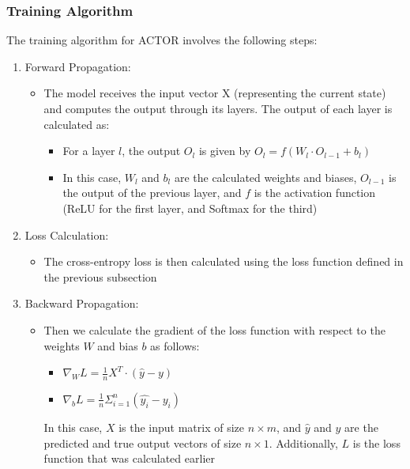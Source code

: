 \documentclass[11pt]{article}
\begin{document}
\subsubsection{Training Algorithm}

The training algorithm for ACTOR involves the following steps:

\begin{enumerate}
    \item Forward Propagation:
    \begin{itemize}
        \item The model receives the input vector X (representing the current state) and computes the output through its layers. The output of each layer is calculated as:
        \begin{itemize}
            \item For a layer $l$, the output $O_l$ is given by $O_l = f(W_l \cdot O_{l - 1} + b_l)$
            \item In this case, $W_l$ and $b_l$ are the calculated weights and biases, $O_{l - 1}$ is the output of the previous layer, and $f$ is the activation function (ReLU for the first layer, and Softmax for the third)
        \end{itemize}
    \end{itemize}
    \item Loss Calculation:
    \begin{itemize}
        \item The cross-entropy loss is then calculated using the loss function defined in the previous subsection
    \end{itemize}
    \item Backward Propagation:
    \begin{itemize}
        \item Then we calculate the gradient of the loss function with respect to the weights $W$ and bias $b$ as follows:
        \begin{itemize}
            \item $\nabla_{W} L = \frac{1}{n} X^{T} \cdot (\hat{y} - y)$
            \item $\nabla_{b} L = \frac{1}{n} \Sigma_{i=1}^{n} (\hat{y_i} - y_i)$
        \end{itemize}
        In this case, $X$ is the input matrix of size $n \times m$, and $\hat{y}$ and $y$ are the predicted and true output vectors of size $n \times 1$. Additionally, $L$ is the loss function that was calculated earlier
    \end{itemize}

\end{enumerate}
\end{document}
